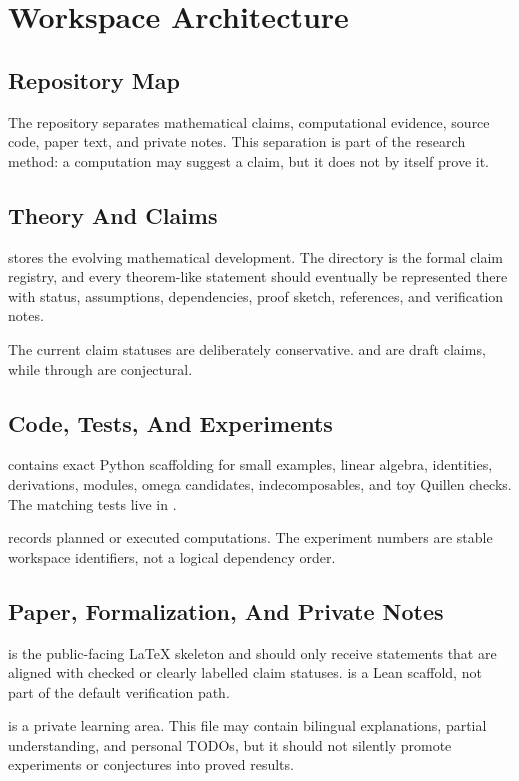 \chapter{Workspace Architecture}

\section{Repository Map}

The repository separates mathematical claims, computational evidence, source
code, paper text, and private notes. This separation is part of the research
method: a computation may suggest a claim, but it does not by itself prove it.

\section{Theory And Claims}

 stores the evolving mathematical development. The directory
 is the formal claim registry, and every theorem-like
statement should eventually be represented there with status, assumptions,
dependencies, proof sketch, references, and verification notes.

The current claim statuses are deliberately conservative. 
and  are draft claims, while  through
 are conjectural.

\section{Code, Tests, And Experiments}

 contains exact Python scaffolding for small examples,
linear algebra, identities, derivations, modules, omega candidates,
indecomposables, and toy Quillen checks. The matching tests live in
.

 records planned or executed computations. The experiment
numbers are stable workspace identifiers, not a logical dependency order.

\section{Paper, Formalization, And Private Notes}

 is the public-facing LaTeX skeleton and should only receive
statements that are aligned with checked or clearly labelled claim statuses.
 is a Lean scaffold, not part of the default verification path.

 is a private learning area. This file may contain bilingual
explanations, partial understanding, and personal TODOs, but it should not
silently promote experiments or conjectures into proved results.

